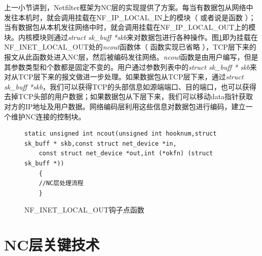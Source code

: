 \par

上一小节讲到，Netfilter框架为NC层的实现提供了方案。每当有数据包从网络中发往本机时，就会调用挂载在NF\_IP\_LOCAL\_IN上的模块（ 或者说是函数 ）；当有数据包从本机发往网络中时，就会调用挂载在NF\_IP\_LOCAL\_OUT上的模块。内核模块则通过\emph{struct sk\_buff *skb}来对数据包进行各种操作。图\ref{NCOUT}即为挂载在NF\_INET\_LOCAL\_OUT处的\emph{ncout}函数体（ 函数实现已省略 ），TCP层下来的报文从此函数处进入NC层，然后被编码发往网络。\emph{ncout}函数是由用户编写，但是其参数类型和个数都是固定不变的。用户通过参数列表中的\emph{struct sk\_buff * skb}来对从TCP层下来的报文做进一步处理。如果数据包从TCP层下来，通过\emph{struct sk\_buff *skb}，我们可以获得TCP的头部信息如源端端口、目的端口，也可以获得去掉TCP头部的用户数据；如果数据包从下层下来，我们可以移动data指针获取对方的IP地址及用户数据。网络编码层利用这些信息对数据包进行编码，建立一个维护NC连接的控制块。
\begin{figure}
	\begin{lstlisting}[language={[ANSI]C}]
	static unsigned int ncout(unsigned int hooknum,struct sk_buff * skb,const struct net_device *in,
	const struct net_device *out,int (*okfn) (struct sk_buff *))
	{
	//NC层处理流程	
	} 
	\end{lstlisting}
	\caption{NF\_INET\_LOCAL\_OUT钩子点函数}
	\label{NCOUT}
\end{figure}

\section{NC层关键技术}
